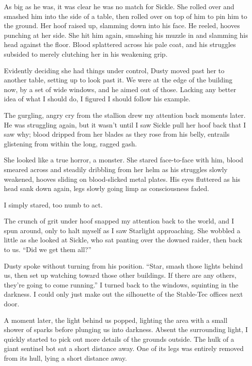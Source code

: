 As big as he was, it was clear he was no match for Sickle. She rolled over and smashed him into the side of a table, then rolled over on top of him to pin him to the ground. Her hoof raised up, slamming down into his face. He reeled, hooves punching at her side. She hit him again, smashing his muzzle in and slamming his head against the floor. Blood splattered across his pale coat, and his struggles subsided to merely clutching her in his weakening grip.

Evidently deciding she had things under control, Dusty moved past her to another table, setting up to look past it. We were at the edge of the building now, by a set of wide windows, and he aimed out of those. Lacking any better idea of what I should do, I figured I should follow his example.

The gurgling, angry cry from the stallion drew my attention back moments later. He was struggling again, but it wasn’t until I saw Sickle pull her hoof back that I saw why; blood dripped from her blades as they rose from his belly, entrails glistening from within the long, ragged gash.

She looked like a true horror, a monster. She stared face-to-face with him, blood smeared across and steadily dribbling from her helm as his struggles slowly weakened, hooves sliding on blood-slicked metal plates. His eyes fluttered as his head sank down again, legs slowly going limp as consciousness faded.

I simply stared, too numb to act.

The crunch of grit under hoof snapped my attention back to the world, and I spun around, only to halt myself as I saw Starlight approaching. She wobbled a little as she looked at Sickle, who sat panting over the downed raider, then back to us. “Did we get them all?”

Dusty spoke without turning from his position. “Star, smash those lights behind us, then set up watching toward those other buildings. If there are any others, they’re going to come running.” I turned back to the windows, squinting in the darkness. I could only just make out the silhouette of the Stable-Tec offices next door.

A moment later, the light behind us popped, lighting the area with a small shower of sparks before plunging us into darkness. Absent the surrounding light, I quickly started to pick out more details of the grounds outside. The hulk of a giant sentinel bot sat a short distance away. One of its legs was entirely removed from its hull, lying a short distance away.

